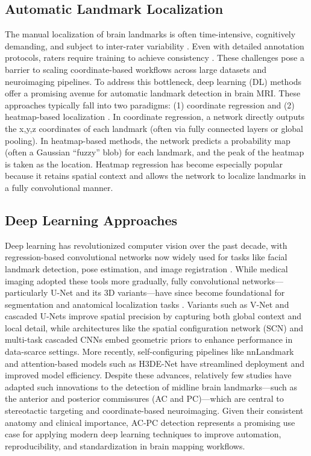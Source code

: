 \subsection{Automatic Landmark Localization}
The manual localization of brain landmarks is often time-intensive, cognitively demanding, and subject to inter-rater variability \cite{Abbass2022-lf, Lau2019-eh,Pallavaram2008-zr}. Even with detailed annotation protocols, raters require training to achieve consistency \cite{Lau2019-eh}. These challenges pose a barrier to scaling coordinate-based workflows across large datasets and neuroimaging pipelines. To address this bottleneck, deep learning (DL) methods offer a promising avenue for automatic landmark detection in brain MRI. These approaches typically fall into two paradigms: (1) coordinate regression \cite{Neupane2024-vt} and (2) heatmap-based localization \cite{Payer2016-ik}. In coordinate regression, a network directly outputs the x,y,z coordinates of each landmark (often via fully connected layers or global pooling). In heatmap-based methods, the network predicts a probability map (often a Gaussian “fuzzy” blob) for each landmark, and the peak of the heatmap is taken as the location. Heatmap regression has become especially popular because it retains spatial context and allows the network to localize landmarks in a fully convolutional manner.

\subsection{Deep Learning Approaches}
Deep learning has revolutionized computer vision over the past decade, with regression-based convolutional networks now widely used for tasks like facial landmark detection, pose estimation, and image registration \cite{Lathuiliere2018-oy}. While medical imaging adopted these tools more gradually, fully convolutional networks—particularly U-Net and its 3D variants—have since become foundational for segmentation and anatomical localization tasks \cite{Akkus2017-eh, Falk2019-us}. Variants such as V-Net and cascaded U-Nets improve spatial precision by capturing both global context and local detail, while architectures like the spatial configuration network (SCN) \cite{Payer2016-ik, Payer2019-sn} and multi-task cascaded CNNs \cite{Zhang2017-dc} embed geometric priors to enhance performance in data-scarce settings. More recently, self-configuring pipelines like nnLandmark \cite{Ertl2025-wu} and attention-based models such as H3DE-Net \cite{Huang2025-vt} have streamlined deployment and improved model efficiency. Despite these advances, relatively few studies have adapted such innovations to the detection of midline brain landmarks—such as the anterior and posterior commissures (AC and PC)—which are central to stereotactic targeting and coordinate-based neuroimaging. Given their consistent anatomy and clinical importance, AC-PC detection represents a promising use case for applying modern deep learning techniques to improve automation, reproducibility, and standardization in brain mapping workflows.


